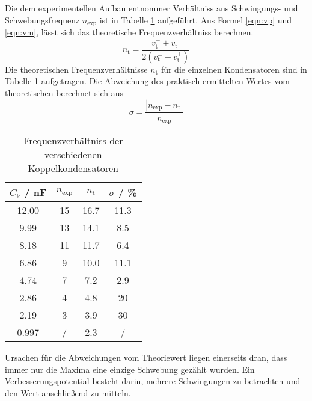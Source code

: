 Die dem experimentellen Aufbau entnommer Verhältniss aus Schwingungs- und Schwebungsfrequenz $n_\text{exp}$ ist in Tabelle \ref{tab:n} aufgeführt. Aus Formel \ref{eqn:vp} und \ref{eqn:vm}, lässt sich das theoretische Frequenzverhältniss berechnen.
\begin{equation}
  n_\text{t} = \frac{ v_\text{t}^+ + v_\text{t}^- }{2(v_\text{t}^- - v_\text{t}^+)}
  \label{eqn:n_t}
\end{equation}
Die theoretischen Frequenzverhältnisse $n_\text{t}$ für die einzelnen Kondensatoren sind in Tabelle \ref{tab:n} aufgetragen. Die Abweichung des praktisch ermittelten Wertes vom theoretischen berechnet sich aus
\begin{equation}
  \sigma = \frac{| n_\text{exp} - n_\text{t} |}{n_\text{exp}}
\end{equation}
\begin{table}
  \centering
  \begin{tabular}{c c c c}
    \toprule
    $C_\text{k}$ / nF & $n_\text{exp}$ & $n_\text{t}$ & $\sigma$ / \%	\\
    \midrule
    12.00	& 15	& 16.7	& 11.3	\\
    9.99	& 13 	& 14.1	& 8.5	\\
    8.18	& 11	& 11.7	& 6.4	\\
    6.86	& 9	& 10.0	& 11.1	\\
    4.74	& 7	& 7.2	& 2.9	\\
    2.86	& 4	& 4.8	& 20	\\
    2.19	& 3 	& 3.9	& 30	\\
    0.997	& /	& 2.3	& /	\\
    \bottomrule
  \end{tabular}
  \caption{Frequenzverhältniss der verschiedenen Koppelkondensatoren}
  \label{tab:n}
\end{table}
Ursachen für die Abweichungen vom Theoriewert liegen einerseits dran, dass immer nur die Maxima eine einzige Schwebung gezählt wurden. Ein Verbesserungspotential besteht darin, mehrere Schwingungen zu betrachten und den Wert anschließend zu mitteln.

